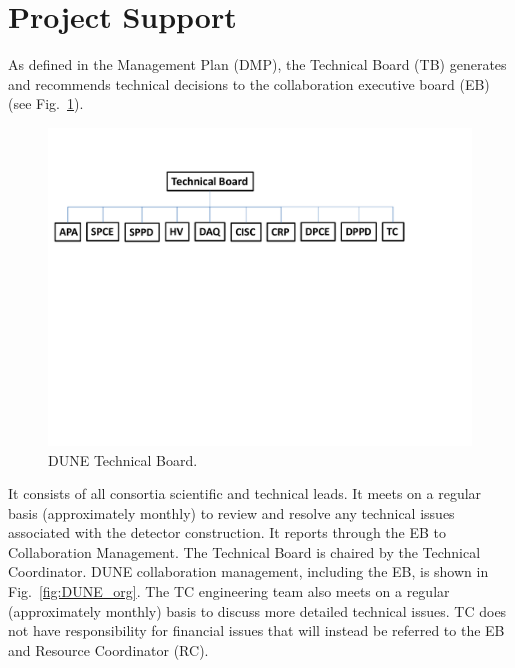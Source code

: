 \section{Project Support}
\label{sec:fdsp-coord-supp}

As defined in the  Management Plan (DMP), the 
Technical Board (TB) generates and recommends technical decisions to the 
collaboration executive board (EB) (see Fig.~\ref{fig:TB_org}).
\begin{figure}[htb]
  \begin{center}
    \includegraphics[width=\textwidth]{far-detector-generic/figures/TB_Org_Chart}
    \caption{DUNE Technical Board.}
    \label{fig:TB_org}
  \end{center}
\end{figure}
It consists of all consortia scientific and technical leads. It meets
on a regular basis (approximately monthly) to review and resolve any
technical issues associated with the detector construction. It reports
through the EB to Collaboration Management. The  Technical
Board is chaired by the Technical Coordinator. DUNE collaboration
management, including the EB, is shown in Fig.~\ref{fig:DUNE_org}. The
TC engineering team also meets on a regular (approximately monthly)
basis to discuss more detailed technical issues. TC does not have
responsibility for financial issues that will instead be referred to
the EB and Resource Coordinator (RC).
